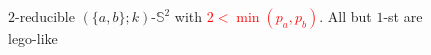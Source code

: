 \documentclass{beamer}
\begin{document}
\begin{frame}
\begin{figure}
$2$-reducible   $(\{a,b\};k)$-$\mathbb{S}^2$ with
\textcolor{red}{$2< \min (p_a,p_b)$}.  All but  $1$-st are lego-like
\end{figure}






 
 
 
 
 

\end{frame}
\end{document}
